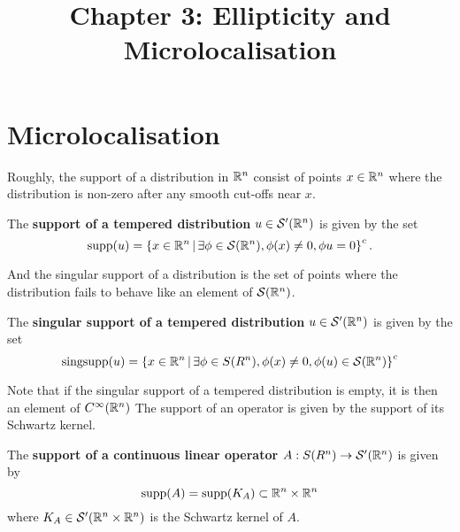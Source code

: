 \documentclass[12pt]{article}
\title{Chapter 3: Ellipticity and Microlocalisation}
\date{}
\begin{document}
\maketitle
\section{Microlocalisation}
Roughly, the support of a distribution in ${\mathbb R}^n$ consist of points $x \in {\ensuremath {\mathbb R}}^n$ where the distribution is non-zero after any smooth cut-offs near $x$. 
\begin{fdefinition}
    The \textbf{support of a tempered distribution} $u \in \mathcal{S}'({\mathbb R}^n)$ is given by the set
    \[
    \mathrm{supp}(u) = \left\{x \in {\ensuremath {\mathbb R}}^n \, | \, \exists \phi \in \mathcal{S}({\mathbb R}^n), \phi(x) \neq 0, \phi u = 0\right\}^c. 
    \]
\end{fdefinition}

And the singular support of a distribution is the set of points where the distribution fails to behave like an element of $\mathcal{S}({\mathbb R}^n)$. 
\begin{fdefinition}
    The \textbf{singular support of a tempered distribution} $ u \in \mathcal{S}'({\mathbb R}^n)$ is given by the set 
    \[
    \mathrm{sing supp}(u) = \left\{x \in {\ensuremath {\mathbb R}}^n \, | \, \exists \phi \in S(R^n), \phi(x) \neq 0, \phi(u) \in \mathcal{S}({\mathbb R}^n)\right\}^c
    \]
\end{fdefinition}
Note that if the singular support of a tempered distribution is empty, it is then an element of $C^\infty({\mathbb R}^n)$ 
The support of an operator is given by the support of its Schwartz kernel. 
\begin{fdefinition}
    The \textbf{support of a continuous linear operator} $A: S(R^n) \to \mathcal{S}'({\mathbb R}^n)$ is given by 
    \[
    \mathrm{supp}(A) = \mathrm{supp}(K_A) \subset {\ensuremath {\mathbb R}}^n \times {\ensuremath {\mathbb R}}^n
    \]
    where $K_A \in \mathcal{S}'({\mathbb R}^n \times {\ensuremath {\mathbb R}}^n)$ is the Schwartz kernel of $A$. 
\end{fdefinition}
\end{document}
